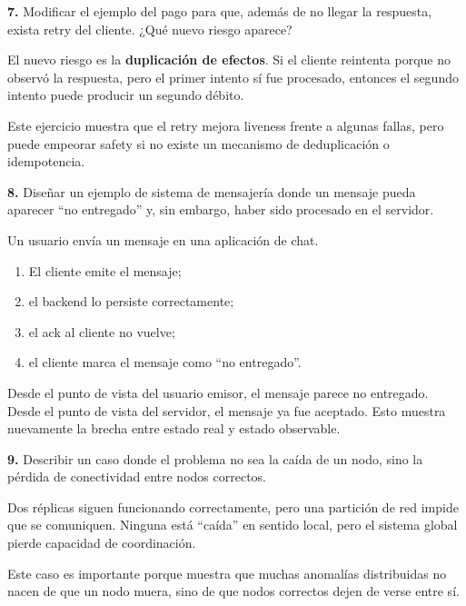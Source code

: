 \documentclass[variant=guia,cover=institutional,mode=screen]{ua-engineering-v6-article}
\begin{document}
\begin{uaexercise}
\textbf{7.}
Modificar el ejemplo del pago para que, además de no llegar la respuesta, exista retry del cliente.
¿Qué nuevo riesgo aparece?
\end{uaexercise}
\begin{uaanswer}
El nuevo riesgo es la \textbf{duplicación de efectos}.
Si el cliente reintenta porque no observó la respuesta, pero el primer intento sí fue procesado, entonces el segundo intento puede producir un segundo débito.

Este ejercicio muestra que el retry mejora liveness frente a algunas fallas, pero puede empeorar safety si no existe un mecanismo de deduplicación o idempotencia.
\end{uaanswer}

\begin{uaexercise}
\textbf{8.}
Diseñar un ejemplo de sistema de mensajería donde un mensaje pueda aparecer “no entregado” y, sin embargo, haber sido procesado en el servidor.
\end{uaexercise}
\begin{uaanswer}
Un usuario envía un mensaje en una aplicación de chat.

\begin{enumerate}
\item El cliente emite el mensaje;
\item el backend lo persiste correctamente;
\item el ack al cliente no vuelve;
\item el cliente marca el mensaje como “no entregado”.
\end{enumerate}

Desde el punto de vista del usuario emisor, el mensaje parece no entregado.
Desde el punto de vista del servidor, el mensaje ya fue aceptado.
Esto muestra nuevamente la brecha entre estado real y estado observable.
\end{uaanswer}

\begin{uaexercise}
\textbf{9.}
Describir un caso donde el problema no sea la caída de un nodo, sino la pérdida de conectividad entre nodos correctos.
\end{uaexercise}
\begin{uaanswer}
Dos réplicas siguen funcionando correctamente, pero una partición de red impide que se comuniquen.
Ninguna está “caída” en sentido local, pero el sistema global pierde capacidad de coordinación.

Este caso es importante porque muestra que muchas anomalías distribuidas no nacen de que un nodo muera, sino de que nodos correctos dejen de verse entre sí.
\end{uaanswer}
\end{document}
